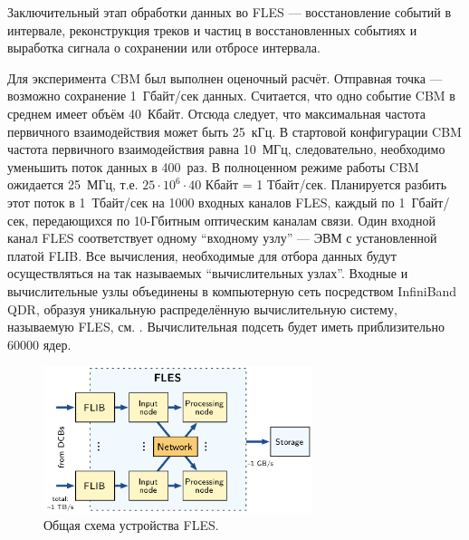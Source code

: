 Заключительный этап обработки данных во FLES --- восстановление событий в интервале, реконструкция треков и частиц в восстановленных событиях и выработка сигнала о сохранении или отбросе интервала.

Для эксперимента CBM был выполнен оценочный расчёт. Отправная точка --- возможно сохранение 1~Гбайт/сек данных. Считается, что одно событие CBM в среднем имеет объём 40~Кбайт. Отсюда следует, что максимальная частота первичного взаимодействия может быть 25~кГц. В стартовой конфигурации CBM частота первичного взаимодействия равна 10~МГц, следовательно, необходимо уменьшить поток данных в 400~раз. В полноценном режиме работы CBM ожидается 25~МГц, т.е. $ 25 \cdot 10^{6} \cdot 40 $ Кбайт = 1 Тбайт/сек. Планируется разбить этот поток в 1~Тбайт/сек на 1000 входных каналов FLES, каждый по 1~Гбайт/сек, передающихся по 10-Гбитным оптическим каналам связи. Один входной канал FLES соответствует одному ``входному узлу'' --- ЭВМ с установленной платой FLIB. Все вычисления, необходимые для отбора данных будут осуществляться на так называемых ``вычислительных узлах''. Входные и вычислительные узлы объединены в компьютерную сеть посредством InfiniBand QDR, образуя уникальную распределённую вычислительную систему, называемую FLES, см. . Вычислительная подсеть будет иметь приблизительно 60000 ядер.

\begin{figure}[H]
\centering
\includegraphics[width=0.7\textwidth]{pictures/FLESarch.png}
\caption{Общая схема устройства FLES.}
\label{fig:FLESarch}
\end{figure}

